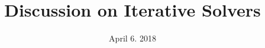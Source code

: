 

\newcommand{\xR}{\mathbb{R}}
\newcommand{\xRd}{{\xR^d}}
\newcommand{\xRN}{{\xR^N}}
\newcommand{\xMNR}{{M_N(\xR)}}
\newcommand{\bb}{{\boldsymbol b}}
\newcommand{\ee}{{\boldsymbol e}}
\newcommand{\ev}{{\boldsymbol \epsilon}}
\newcommand{\rr}{{\boldsymbol r}}
\newcommand{\xx}{{\boldsymbol x}}
\newcommand{\hx}{\hat{\boldsymbol x}}
\newcommand{\yy}{{\boldsymbol y}}
\newcommand{\vv}{{\boldsymbol v}}
\newcommand{\ww}{{\boldsymbol w}}
\newcommand{\zz}{{\boldsymbol z}}
\renewcommand{\mA}{{\mathrm A}}
\newcommand{\mB}{{\mathrm B}}
\newcommand{\mC}{{\mathrm C}}
\newcommand{\mD}{{\mathrm D}}
\newcommand{\mG}{{\mathrm G}}
\newcommand{\mH}{{\mathrm H}}
\renewcommand{\mL}{{\mathrm L}}
\newcommand{\mLs}{{\mathrm L_0}}
\newcommand{\mM}{{\mathrm M}}
\newcommand{\mRs}{{\mathrm R_0}}
\newcommand{\mR}{{\mathrm R}}
\newcommand{\mP}{{\mathrm P}}
\newcommand{\mQ}{{\mathrm Q}}
\newcommand{\mU}{{\mathrm U}}
\newcommand{\mId}{{\mathbf{Id}}}
\newcommand{\mII}{{\mathbf{\mathbb{I}}}}
\newcommand{\Seq}[1]{\bigl(#1\bigr)}
\newcommand{\Cond}[1]{\mathcal{C}(#1)}
\newcommand{\Order}[1]{\mathcal{O}\left(#1\right)}
\newcommand{\norm}[1]{{\lVert #1 \rVert}}
\newcommand{\norminf}[1]{\norm{#1}_{\infty}}

\newcommand{\InnerK}[2]{{{\mathbf\langle}\;#1\:,\: #2 \;{\rangle}}}
\newcommand{\Inner}[2]{{{\scriptstyle\mathbf{(}}\;#1\:,\: #2 \;{\scriptstyle\mathbf{)}}}}


\title{Discussion on Iterative Solvers}
\date{April 6. 2018}

\maketitle

